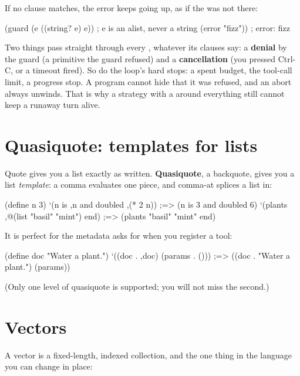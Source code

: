 If no clause matches, the error keeps going up, as if the  was
not there:

\begin{scm}
(guard (e ((string? e) e))    ; e is an alist, never a string
  (error "fizz"))             ; error: fizz
\end{scm}

\begin{careful}
Two things pass straight through every , whatever its clauses
say: a \textbf{denial} by the guard (a primitive the guard refused) and a
\textbf{cancellation} (you pressed Ctrl-C, or a timeout fired). So do the
loop's hard stops: a spent budget, the tool-call limit, a progress stop.
A program cannot hide that it was refused, and an abort always unwinds.
That is why a strategy with a  around
everything still cannot keep a runaway turn alive.
\end{careful}

\section{Quasiquote: templates for lists}

Quote gives you a list exactly as written. \textbf{Quasiquote}, a
backquote, gives you a list \emph{template}: a comma evaluates one piece,
and comma-at splices a list in:

\begin{scm}
(define n 3)
`(n is ,n and doubled ,(* 2 n))          ;=> (n is 3 and doubled 6)
`(plants ,@(list "basil" "mint") end)    ;=> (plants "basil" "mint" end)
\end{scm}

It is perfect for the metadata \nodwyn{} asks for when you register a tool:

\begin{scm}
(define doc "Water a plant.")
`((doc . ,doc) (params . ()))            ;=> ((doc . "Water a plant.") (params))
\end{scm}

(Only one level of quasiquote is supported; you will not miss the second.)

\section{Vectors}

A vector is a fixed-length, indexed collection, and the one thing in the
language you can change in place:

